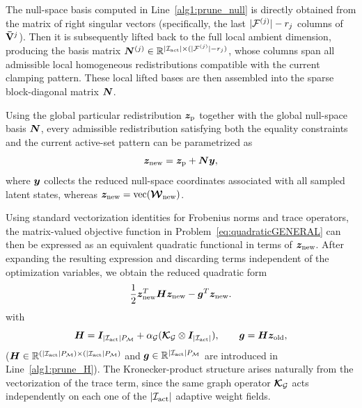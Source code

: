 \documentclass[preprint,10pt]{elsarticle}  %
\begin{document}
%
The null-space basis computed in
Line~\ref{alg1:prune_null}  is directly obtained from the matrix of right singular vectors  (specifically, the last  $|\mathcal{F}^{(j)}| -r_j$ columns of  \(\mathbf{\bar{V}}^{j}\)).
 Then  it is subsequently
lifted back to the full local ambient dimension, producing  the basis matrix
$\bm{N}^{(j)}\in\mathbb{R}^{|\mathcal{I}_{\mathrm{act}}|\times(|\mathcal{F}^{(j)}|-r_j)}$, whose columns span all admissible local homogeneous redistributions
compatible with the current clamping pattern. These local lifted bases  are then assembled into the sparse
block-diagonal matrix \(\bm{N}\).

Using the global particular redistribution \(\bm{z}_{\mathrm{p}}\) together with the
global null-space basis \(\bm{N}\), every admissible redistribution
satisfying both the equality constraints and the current active-set
pattern can be parametrized as
\begin{equation}
\label{eq:nullp}
\bm{z}_{\mathrm{new}}
=
\bm{z}_{\mathrm{p}}+\bm{N}\bm{y},
\end{equation}
where \(\bm{y}\) collects the reduced null-space coordinates associated
with all sampled latent states, whereas $\bm{z}_{\mathrm{new}}=\operatorname{vec}(\boldsymbol{\mathcal{W}}_{\mathrm{new}})$.


 Using standard
vectorization identities for Frobenius norms and trace operators, the
matrix-valued objective function in Problem~\eqref{eq:quadraticGENERAL} can then be expressed as an equivalent quadratic
functional in terms of \(\bm{z}_{\mathrm{new}}\). After expanding the resulting
expression and discarding terms independent of the optimization
variables, we obtain the reduced quadratic form
\begin{equation}
\label{eq:quadar}
\frac12\bm{z}_{\mathrm{new}}^T\bm{H}\bm{z}_{\mathrm{new}}-\bm{g}^T\bm{z}_{\mathrm{new}}.
\end{equation}
with
\begin{equation}
 \label{eq:Hoperator}
\bm{H}
=
\bm{I}_{|\mathcal{I}_{\mathrm{act}}|P_{\mathcal{M}}}
+
\alpha_{\mathcal{G}}
(\boldsymbol{\mathcal{K}}_{\mathcal{G}}\otimes\bm{I}_{|\mathcal{I}_{\mathrm{act}}|}),
\qquad
\bm{g}
=
\bm{H}\bm{z}_{\mathrm{old}},
\end{equation}
(\(\bm{H}\in\mathbb{R}^{(|\mathcal{I}_{\mathrm{act}}|P_{\mathcal{M}})\times(|\mathcal{I}_{\mathrm{act}}|P_{\mathcal{M}})}\) and
\(\bm{g}\in\mathbb{R}^{|\mathcal{I}_{\mathrm{act}}|P_{\mathcal{M}}}\) are introduced in
Line~\ref{alg1:prune_H}). The Kronecker-product
structure arises naturally from the vectorization of the trace term,
since the same graph operator \(\boldsymbol{\mathcal{K}}_{\mathcal{G}}\) acts independently on each one
of the \( |\mathcal{I}_{\mathrm{act}}| \) adaptive weight fields.
\end{document}
